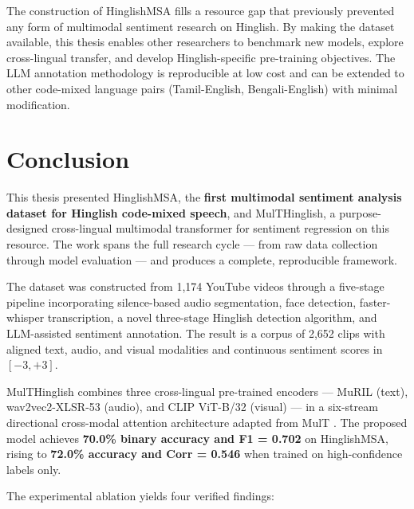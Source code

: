 The construction of HinglishMSA fills a resource gap that previously prevented any form of multimodal sentiment research on Hinglish. By making the dataset available, this thesis enables other researchers to benchmark new models, explore cross-lingual transfer, and develop Hinglish-specific pre-training objectives. The LLM annotation methodology is reproducible at low cost and can be extended to other code-mixed language pairs (Tamil-English, Bengali-English) with minimal modification.

\section{Conclusion}

This thesis presented HinglishMSA, the \textbf{first multimodal sentiment analysis dataset for Hinglish code-mixed speech}, and MulTHinglish, a purpose-designed cross-lingual multimodal transformer for sentiment regression on this resource. The work spans the full research cycle --- from raw data collection through model evaluation --- and produces a complete, reproducible framework.

The dataset was constructed from 1,174 YouTube videos through a five-stage pipeline incorporating silence-based audio segmentation, face detection, faster-whisper transcription, a novel three-stage Hinglish detection algorithm, and LLM-assisted sentiment annotation. The result is a corpus of 2,652 clips with aligned text, audio, and visual modalities and continuous sentiment scores in $[-3, +3]$.

MulTHinglish combines three cross-lingual pre-trained encoders --- MuRIL (text), wav2vec2-XLSR-53 (audio), and CLIP ViT-B/32 (visual) --- in a six-stream directional cross-modal attention architecture adapted from MulT \cite{tsai2019multimodal}. The proposed model achieves \textbf{70.0\% binary accuracy and F1 = 0.702} on HinglishMSA, rising to \textbf{72.0\% accuracy and Corr = 0.546} when trained on high-confidence labels only.

The experimental ablation yields four verified findings:

